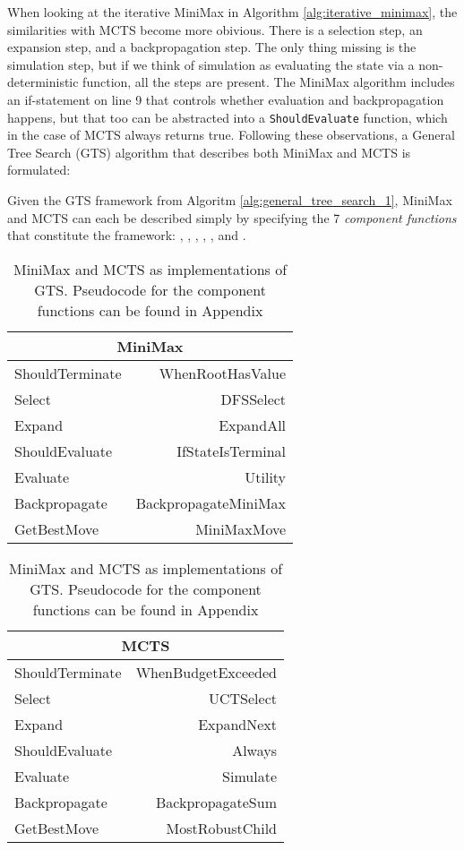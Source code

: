 

When looking at the iterative MiniMax in Algorithm \ref{alg:iterative_minimax},
the similarities with MCTS become more obivious. There is a selection step,
an expansion step, and a backpropagation step. The only thing missing is 
the simulation step, but if we think of simulation as evaluating the state
via a non-deterministic function, all the steps are present. The MiniMax
algorithm includes an if-statement on line 9 that controls whether evaluation
and backpropagation happens, but that too can be abstracted into a
\lstinline|ShouldEvaluate| function, which in the case of MCTS always
returns true. Following these observations, a General Tree Search (GTS)
algorithm that describes both MiniMax and MCTS is formulated:



Given the GTS framework from Algoritm \ref{alg:general_tree_search_1}, 
MiniMax and MCTS can each be described simply by specifying the 7 
\textit{component functions} that constitute the framework: 
, , , 
, , and .

\begin{table}[H]
    \centering
    \begin{tabular}{|l|r|}
        \hline
        \multicolumn{2}{|c|}{MiniMax} \\ \hline
        ShouldTerminate & WhenRootHasValue \\ \hline
        Select & DFSSelect \\ \hline
        Expand & ExpandAll \\ \hline
        ShouldEvaluate & IfStateIsTerminal \\ \hline
        Evaluate & Utility \\ \hline
        Backpropagate & BackpropagateMiniMax \\ \hline
        GetBestMove & MiniMaxMove \\ \hline
    \end{tabular}
    \quad
    \begin{tabular}{|l|r|}
        \hline
        \multicolumn{2}{|c|}{MCTS} \\ \hline
        ShouldTerminate & WhenBudgetExceeded \\ \hline
        Select & UCTSelect \\ \hline
        Expand & ExpandNext \\ \hline
        ShouldEvaluate & Always \\ \hline
        Evaluate & Simulate \\ \hline
        Backpropagate & BackpropagateSum \\ \hline
        GetBestMove & MostRobustChild \\ \hline
    \end{tabular}
    \caption{MiniMax and MCTS as implementations of GTS. Pseudocode
    for the component functions can be found in Appendix \todo}
    \label{tab:minimax_mcts_schematics}
\end{table}

